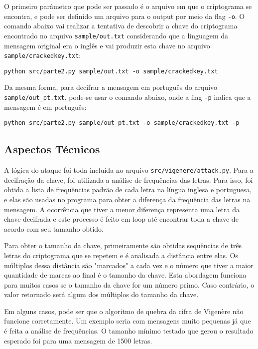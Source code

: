 \documentclass[12pt]{article}
\begin{document}
O primeiro parâmetro que pode ser passado é o arquivo em que o criptograma se encontra, e pode ser definido um arquivo para o output por meio da flag \texttt{-o}. O comando abaixo vai realizar a tentativa de descobrir a chave do criptograma encontrado no arquivo \texttt{sample/out.txt} considerando que a linguagem da mensagem original era o inglês e vai produzir esta chave no arquivo \texttt{sample/crackedkey.txt}:

\begin{lstlisting}
python src/parte2.py sample/out.txt -o sample/crackedkey.txt
\end{lstlisting}

Da mesma forma, para decifrar a mensagem em português do arquivo \texttt{sample/out\_pt.txt}, pode-se usar o comando abaixo, onde a flag \texttt{-p} indica que a mensagem é em português:

\begin{lstlisting}
python src/parte2.py sample/out_pt.txt -o sample/crackedkey.txt -p
\end{lstlisting}

\subsection{Aspectos Técnicos}
A lógica do ataque foi toda incluída no arquivo \texttt{src/vigenere/attack.py}. Para a decifração da chave, foi utilizada a análise de frequências das letras. Para isso, foi obtida a lista de frequências padrão de cada letra na língua inglesa e portuguesa, e elas são usadas no programa para obter a diferença da frequência das letras na mensagem. A ocorrência que tiver a menor diferença representa uma letra da chave decifrada e este processo é feito em loop até encontrar toda a chave de acordo com seu tamanho obtido.

Para obter o tamanho da chave, primeiramente são obtidas sequências de três letras do criptograma que se repetem e é analisada a distância entre elas. Os múltiplos dessa distância são "marcados" a cada vez e o número que tiver a maior quantidade de marcas ao final é o tamanho da chave. Esta abordagem funciona para muitos casos se o tamanho da chave for um número primo. Caso contrário, o valor retornado será algum dos múltiplos do tamanho da chave.

Em alguns casos, pode ser que o algoritmo de quebra da cifra de Vigenère não funcione corretamente. Um exemplo seria com mensagens muito pequenas já que é feita a análise de frequências. O tamanho mínimo testado que gerou o resultado esperado foi para uma mensagem de 1500 letras.
\end{document}
